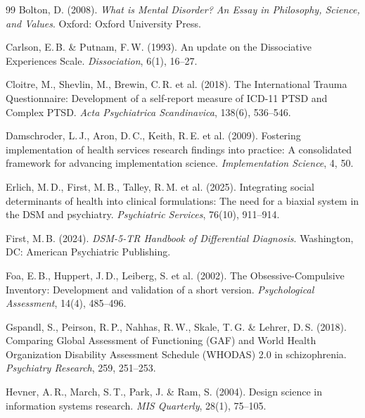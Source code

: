 \documentclass[11pt,a4paper]{article}
\begin{document}
\begin{thebibliography}{99}
Bolton, D. (2008).
\newblock \textit{What is Mental Disorder? An Essay in Philosophy, Science, and Values}.
\newblock Oxford: Oxford University Press.

Carlson, E.\,B. \& Putnam, F.\,W. (1993).
\newblock An update on the Dissociative Experiences Scale.
\newblock \textit{Dissociation}, 6(1), 16--27.

Cloitre, M., Shevlin, M., Brewin, C.\,R. et al. (2018).
\newblock The International Trauma Questionnaire: Development of a self-report measure of ICD-11 PTSD and Complex PTSD.
\newblock \textit{Acta Psychiatrica Scandinavica}, 138(6), 536--546.

Damschroder, L.\,J., Aron, D.\,C., Keith, R.\,E. et al. (2009).
\newblock Fostering implementation of health services research findings into practice: A consolidated framework for advancing implementation science.
\newblock \textit{Implementation Science}, 4, 50.

Erlich, M.\,D., First, M.\,B., Talley, R.\,M. et al. (2025).
\newblock Integrating social determinants of health into clinical formulations: The need for a biaxial system in the DSM and psychiatry.
\newblock \textit{Psychiatric Services}, 76(10), 911--914.

First, M.\,B. (2024).
\newblock \textit{DSM-5-TR Handbook of Differential Diagnosis}.
\newblock Washington, DC: American Psychiatric Publishing.

Foa, E.\,B., Huppert, J.\,D., Leiberg, S. et al. (2002).
\newblock The Obsessive-Compulsive Inventory: Development and validation of a short version.
\newblock \textit{Psychological Assessment}, 14(4), 485--496.

Gspandl, S., Peirson, R.\,P., Nahhas, R.\,W., Skale, T.\,G. \& Lehrer, D.\,S. (2018).
\newblock Comparing Global Assessment of Functioning (GAF) and World Health Organization Disability Assessment Schedule (WHODAS) 2.0 in schizophrenia.
\newblock \textit{Psychiatry Research}, 259, 251--253.

Hevner, A.\,R., March, S.\,T., Park, J. \& Ram, S. (2004).
\newblock Design science in information systems research.
\newblock \textit{MIS Quarterly}, 28(1), 75--105.


\end{thebibliography}
\end{document}
